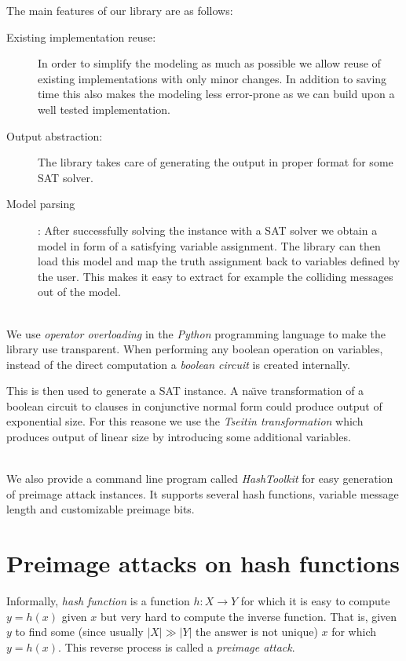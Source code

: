 \documentclass[myposter,portrait]{sciposter}
\def\mysection#1{
{\color{sectionCol}\section*{\sc\bfseries #1}}}
\begin{document}
\begin{multicols*}{3}
The main features of our library are as follows:

\begin{description}
\item[Existing implementation reuse:] In order to simplify the modeling as much as possible we allow reuse of existing implementations with only minor changes.
In addition to saving time this also makes the modeling less error-prone as we can build upon a well tested implementation.

\item[Output abstraction:] The library takes care of generating the output in proper format for some SAT solver.

\item[Model parsing]: After successfully solving the instance with a SAT solver we obtain a model in form of a satisfying variable assignment.
The library can then load this model and map the truth assignment back to variables defined by the user.
This makes it easy to extract for example the colliding messages out of the model.
\end{description}
~\\

We use \emph{operator overloading} in the \emph{Python} programming language to make the library use transparent.
When performing any boolean operation on variables, instead of the direct computation a \emph{boolean circuit} is created internally.

This is then used to generate a SAT instance.
A na\"{\i}ve transformation of a boolean circuit to clauses in conjunctive normal form could produce output of exponential size.
For this reasone we use the \emph{Tseitin transformation} which produces output of linear size by introducing some additional variables.

~\\

We also provide a command line program called \emph{HashToolkit} for easy generation of preimage attack instances.
It supports several hash functions, variable message length and customizable preimage bits.

\columnbreak
\mysection{Preimage attacks on hash functions}
Informally, \emph{hash function} is a function $h: X \to Y$ for which it is easy to compute $y = h(x)$ given $x$ but very hard to compute the inverse function.
That is, given $y$ to find some (since usually $|X| \gg |Y|$ the answer is not unique) $x$ for which $y = h(x)$.
This reverse process is called a \emph{preimage attack}.


\end{multicols*}
\end{document}
